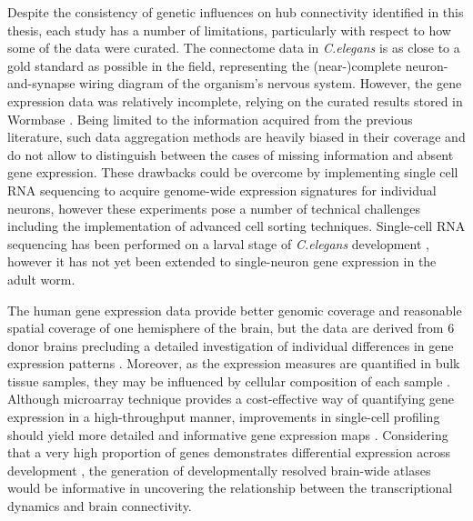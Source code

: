 Despite the consistency of genetic influences on hub connectivity identified in this thesis, each study has a number of limitations, particularly with respect to how some of the data were curated. The connectome data in \textit{C.elegans} is as close to a gold standard as possible in the field, representing the (near-)complete neuron-and-synapse wiring diagram of the organism's nervous system. However, the gene expression data was relatively incomplete, relying on the curated results stored in Wormbase \citep{Harris2010}. Being limited to the information acquired from the previous literature, such data aggregation methods are heavily biased in their coverage and do not allow to distinguish between the cases of missing information and absent gene expression. These drawbacks could be overcome by implementing single cell RNA sequencing to acquire genome-wide expression signatures for individual neurons, however these experiments pose a number of technical challenges including the implementation of advanced cell sorting techniques. Single-cell RNA sequencing has been performed on a larval stage of \textit{C.elegans} development \citep{Cao2017}, however it has not yet been extended to single-neuron gene expression in the adult worm.

The human gene expression data provide better genomic coverage and reasonable spatial coverage of one hemisphere of the brain, but the data are derived from 6 donor brains precluding a detailed investigation of individual differences in gene expression patterns \citep{Arnatkeviciute2019,Hawrylycz2015}. Moreover, as the expression measures are quantified in bulk tissue samples, they may be influenced by cellular composition of each sample \citep{Tasic2016}. Although microarray technique provides a cost-effective way of quantifying gene expression in a high-throughput manner, improvements in single-cell profiling should yield more detailed and informative gene expression maps \citep{Lein2017}. Considering that a very high proportion of genes demonstrates differential expression across development \citep{Colantuoni2011}, the generation of developmentally resolved brain-wide atlases would be informative in uncovering the relationship between the transcriptional dynamics and brain connectivity.

